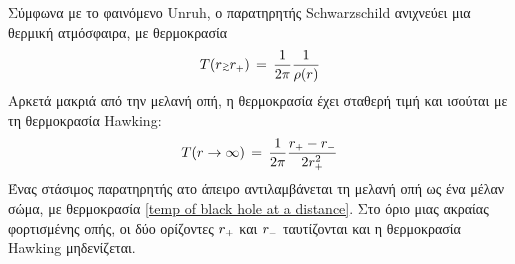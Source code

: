 Σύμφωνα με το φαινόμενο Unruh, ο παρατηρητής Schwarzschild ανιχνεύει μια θερμική ατμόσφαιρα, με θερμοκρασία
\begin{equation}
    T(r{\scriptscriptstyle\gtrsim} r\subscr{+})\,=\,\frac{1}{2\pi}\frac{1}{\rho(r)}
\end{equation}
Αρκετά μακριά από την μελανή οπή, η θερμοκρασία έχει σταθερή τιμή και ισούται με τη θερμοκρασία Hawking: 
\begin{equation}\label{temp of black hole at a distance}
    T(r\rightarrow\infty)\,=\,\frac{1}{2\pi}\frac{r\subscr{+}-r\subscr{-}}{2r\subscr{+}^2}
\end{equation}
Ένας στάσιμος παρατηρητής ατο άπειρο αντιλαμβάνεται τη μελανή οπή ως ένα μέλαν σώμα, με θερμοκρασία 
\eqref{temp of black hole at a distance}. Στο όριο μιας ακραίας φορτισμένης οπής, οι δύο ορίζοντες $r\subscr{+}$ και $r\subscr{-}$ ταυτίζονται και η θερμοκρασία Hawking  μηδενίζεται. 

